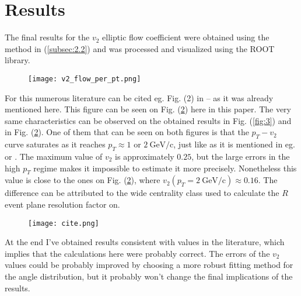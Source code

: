 \section{Results} \label{sec:3}
The final results for the $v_{2}$ elliptic flow coefficient were obtained using the method in (\ref{subsec:2.2}) and was processed and visualized using the ROOT library.

\begin{figure}[h]
	\centering
	\texttt{[image: v2\_flow\_per\_pt.png]}
	\label{fig:4}
\end{figure}

For this numerous literature can be cited eg. Fig. (2) in \citep{Collaboration2003} -- as it was already mentioned here. This figure can be seen on Fig. (\ref{fig:5}) here in this paper. The very same characteristics can be observed on the obtained results in Fig. (\ref{fig:3}) and in Fig. (\ref{fig:5}). One of them that can be seen on both figures is that the $p_{T} - v_{2}$ curve saturates as it reaches $p_{T} \approx 1$ or $2\ \mathrm{GeV}/\mathrm{c}$, just like as it is mentioned in eg. \citep{Collaboration2003} or \citep{Retiere2004}. The maximum value of $v_{2}$ is approximately $0.25$, but the large errors in the high $p_{T}$ regime makes it impossible to estimate it more precisely. Nonetheless this value is close to the ones on Fig. (\ref{fig:5}), where $v_{2} \left( p_{T} = 2\ \mathrm{GeV}/\mathrm{c} \right) \approx 0.16$. The difference can be attributed to the wide centrality class used to calculate the $R$ event plane resolution factor on.

\begin{figure}[h]
	\centering
	\texttt{[image: cite.png]}
	\label{fig:5}
\end{figure}

At the end I've obtained results consistent with values in the literature, which implies that the calculations here were probably correct. The errors of the $v_{2}$ values could be probably improved by choosing a more robust fitting method for the angle distribution, but it probably won't change the final implications of the results.